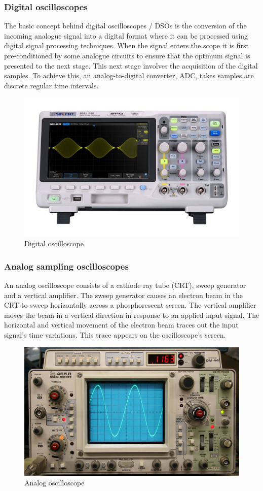 \documentclass[letterpaper]{article}
\begin{document}
\subsubsection*{Digital oscilloscopes}
The basic concept behind digital oscilloscopes / DSOs is the conversion of the incoming analogue signal into a digital format where it can be processed using digital signal processing techniques.
When the signal enters the scope it is first pre-conditioned by some analogue circuits to ensure that the optimum signal is presented to the next stage.
This next stage involves the acquisition of the digital samples. To achieve this, an analog-to-digital converter, ADC, takes samples are discrete regular time intervals.
\begin{figure}[H]
    \centering
    \includegraphics[width=.4\linewidth]{img/intro/digital_os}
    \caption{Digital oscilloscope}
\end{figure}
\subsubsection*{Analog sampling oscilloscopes}
An analog oscilloscope consists of a cathode ray tube (CRT), sweep generator and a vertical amplifier. The sweep generator causes an electron beam in the CRT to sweep horizontally across a phosphorescent screen. The vertical amplifier moves the beam in a vertical direction in response to an applied input signal. The horizontal and vertical movement of the electron beam traces out the input signal's time variations. This trace appears on the oscilloscope's screen.
\begin{figure}[H]
    \centering
    \includegraphics[width=.4\linewidth]{img/intro/analog_os}
    \caption{Analog oscilloscope}
\end{figure}
\end{document}
